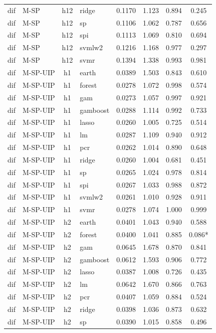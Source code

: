 \begin{ThreePartTable}
\begin{longtable}[t]{llclcccc}
dif & M-SP & h12 & ridge & 0.1170 & 1.123 & 0.894 & 0.245\\
dif & M-SP & h12 & sp & 0.1106 & 1.062 & 0.787 & 0.656\\
dif & M-SP & h12 & spi & 0.1113 & 1.069 & 0.810 & 0.694\\
dif & M-SP & h12 & svmlw2 & 0.1216 & 1.168 & 0.977 & 0.297\\
dif & M-SP & h12 & svmr & 0.1394 & 1.338 & 0.993 & 0.981\\
\addlinespace
dif & M-SP-UIP & h1 & earth & 0.0389 & 1.503 & 0.843 & 0.610\\
dif & M-SP-UIP & h1 & forest & 0.0278 & 1.072 & 0.998 & 0.574\\
dif & M-SP-UIP & h1 & gam & 0.0273 & 1.057 & 0.997 & 0.921\\
dif & M-SP-UIP & h1 & gamboost & 0.0288 & 1.114 & 0.992 & 0.733\\
dif & M-SP-UIP & h1 & lasso & 0.0260 & 1.005 & 0.725 & 0.514\\
dif & M-SP-UIP & h1 & lm & 0.0287 & 1.109 & 0.940 & 0.912\\
dif & M-SP-UIP & h1 & pcr & 0.0262 & 1.014 & 0.890 & 0.648\\
dif & M-SP-UIP & h1 & ridge & 0.0260 & 1.004 & 0.681 & 0.451\\
dif & M-SP-UIP & h1 & sp & 0.0265 & 1.024 & 0.978 & 0.814\\
dif & M-SP-UIP & h1 & spi & 0.0267 & 1.033 & 0.988 & 0.872\\
dif & M-SP-UIP & h1 & svmlw2 & 0.0261 & 1.010 & 0.928 & 0.911\\
dif & M-SP-UIP & h1 & svmr & 0.0278 & 1.074 & 1.000 & 0.999\\
\addlinespace
dif & M-SP-UIP & h2 & earth & 0.0401 & 1.043 & 0.940 & 0.588\\
dif & M-SP-UIP & h2 & forest & 0.0400 & 1.041 & 0.885 & 0.086*\\
dif & M-SP-UIP & h2 & gam & 0.0645 & 1.678 & 0.870 & 0.841\\
dif & M-SP-UIP & h2 & gamboost & 0.0612 & 1.593 & 0.906 & 0.772\\
dif & M-SP-UIP & h2 & lasso & 0.0387 & 1.008 & 0.726 & 0.435\\
dif & M-SP-UIP & h2 & lm & 0.0642 & 1.670 & 0.866 & 0.763\\
dif & M-SP-UIP & h2 & pcr & 0.0407 & 1.059 & 0.884 & 0.524\\
dif & M-SP-UIP & h2 & ridge & 0.0398 & 1.036 & 0.873 & 0.632\\
dif & M-SP-UIP & h2 & sp & 0.0390 & 1.015 & 0.858 & 0.496\\

\end{longtable}
\end{ThreePartTable}
